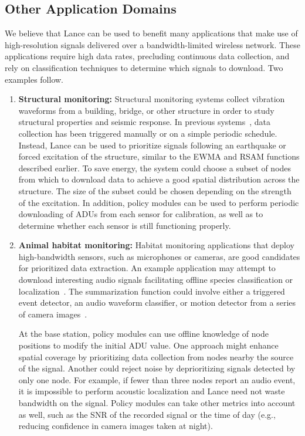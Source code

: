 \subsection{Other Application Domains}

We believe that Lance can be used to benefit many applications that make use
of high-resolution signals delivered over a bandwidth-limited wireless
network. These applications require high data rates, precluding continuous
data collection, and rely on classification techniques to determine which
signals to download. Two examples follow.

\begin{enumerate}

\item \textbf{Structural monitoring:} Structural monitoring systems collect
vibration waveforms from a building, bridge, or other structure in order to
study structural properties and seismic response. In previous
systems~\cite{netshm-emnets05,ggb-ipsn07}, data collection has been triggered
manually or on a simple periodic schedule. Instead, Lance can be used to
prioritize signals following an earthquake or forced excitation of the
structure, similar to the EWMA and RSAM functions described earlier. To save
energy, the system could choose a subset of nodes from which to download data
to achieve a good spatial distribution across the structure. The size of the
subset could be chosen depending on the strength of the excitation. In
addition, policy modules can be used to perform periodic downloading of ADUs
from each sensor for calibration, as well as to determine whether each sensor
is still functioning properly.

\item \textbf{Animal habitat monitoring:} Habitat monitoring applications
that deploy high-bandwidth sensors, such as microphones or cameras, are good
candidates for prioritized data extraction. An example application may
attempt to download interesting audio signals facilitating offline species
classification or localization~\cite{girod-ipsn07}. The summarization
function could involve either a triggered event detector, an audio waveform
classifier, or motion detector from a series of camera images~\cite{cyclops}.

At the base station, policy modules can use offline knowledge of node
positions to modify the initial ADU value. One approach might enhance spatial
coverage by prioritizing data collection from nodes nearby the source of the
signal. Another could reject noise by deprioritizing signals detected by only
one node. For example, if fewer than three nodes report an audio event, it is
impossible to perform acoustic localization and Lance need not waste
bandwidth on the signal. Policy modules can take other metrics into account
as well, such as the SNR of the recorded signal or the time of day (e.g.,
reducing confidence in camera images taken at night).

\end{enumerate}

